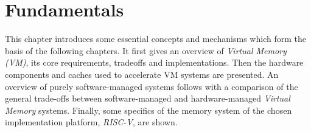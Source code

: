 \chapter{Fundamentals} %
\label{chap:fund}

%


This chapter introduces some essential concepts and mechanisms which form the basis of the following
chapters. It first gives an overview of \textit{Virtual Memory (VM)}, its core requirements,
tradeoffs and implementations.
Then the hardware components and caches used to accelerate VM systems are
presented.
An overview of purely software-managed systems follows with a comparison of the general trade-offs
between software-managed and hardware-managed \textit{Virtual Memory} systems.
Finally, some specifics of the memory system of the chosen implementation platform, \textit{RISC-V},
are shown.


